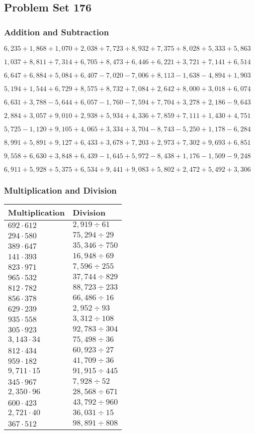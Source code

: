 \hypertarget{problem-set-176}{%
\subsection{Problem Set 176}\label{problem-set-176}}

\hypertarget{addition-and-subtraction}{%
\subsubsection{Addition and
Subtraction}\label{addition-and-subtraction}}

\(6,235+1,868+1,070+2,038+7,723+8,932+7,375+8,028+5,333+5,863\)

\(1,037+8,811+7,314+6,705+8,473+6,446+6,221+3,721+7,141+6,514\)

\(6,647+6,884+5,084+6,407-7,020-7,006+8,113-1,638-4,894+1,903\)

\(5,194+1,544+6,729+8,575+8,732+7,084+2,642+8,000+3,018+6,074\)

\(6,631+3,788-5,644+6,057-1,760-7,594+7,704+3,278+2,186-9,643\)

\(2,884+3,057+9,010+2,938+5,934+4,336+7,859+7,111+1,430+4,751\)

\(5,725-1,120+9,105+4,065+3,334+3,704-8,743-5,250+1,178-6,284\)

\(8,991+5,891+9,127+6,433+3,678+7,203+2,973+7,302+9,693+6,851\)

\(9,558+6,630+3,848+6,439-1,645+5,972-8,438+1,176-1,509-9,248\)

\(6,911+5,928+5,375+6,534+9,441+9,083+5,802+2,472+5,492+3,306\)

\hypertarget{multiplication-and-division}{%
\subsubsection{Multiplication and
Division}\label{multiplication-and-division}}

\begin{longtable}[]{@{}ll@{}}
\toprule
Multiplication & Division\tabularnewline
\midrule
\endhead
\(692\cdot612\) & \(2,919÷61\)\tabularnewline
\(294\cdot580\) & \(75,294÷29\)\tabularnewline
\(389\cdot647\) & \(35,346÷750\)\tabularnewline
\(141\cdot393\) & \(16,948÷69\)\tabularnewline
\(823\cdot971\) & \(7,596÷255\)\tabularnewline
\(965\cdot532\) & \(37,744÷829\)\tabularnewline
\(812\cdot782\) & \(88,723÷233\)\tabularnewline
\(856\cdot378\) & \(66,486÷16\)\tabularnewline
\(629\cdot239\) & \(2,952÷93\)\tabularnewline
\(935\cdot558\) & \(3,312÷108\)\tabularnewline
\(305\cdot923\) & \(92,783÷304\)\tabularnewline
\(3,143\cdot34\) & \(75,498÷36\)\tabularnewline
\(812\cdot434\) & \(60,923÷27\)\tabularnewline
\(959\cdot182\) & \(41,709÷36\)\tabularnewline
\(9,711\cdot15\) & \(91,915÷445\)\tabularnewline
\(345\cdot967\) & \(7,928÷52\)\tabularnewline
\(2,350\cdot96\) & \(28,568÷671\)\tabularnewline
\(600\cdot423\) & \(43,792÷960\)\tabularnewline
\(2,721\cdot40\) & \(36,031÷15\)\tabularnewline
\(367\cdot512\) & \(98,891÷808\)\tabularnewline
\bottomrule
\end{longtable}
